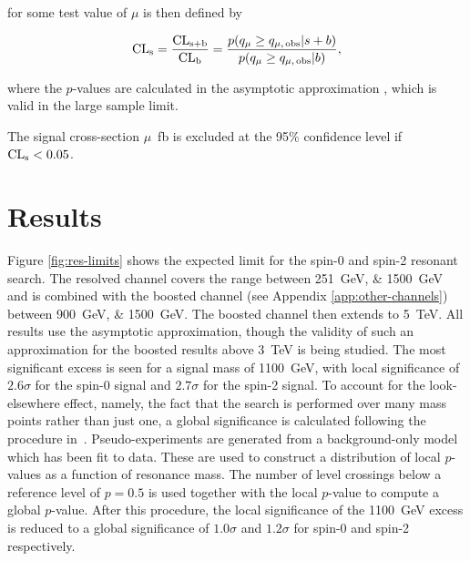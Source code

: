 \CLs for some test value of $\mu$ is then defined by

\begin{equation}
	\label{eqn:cls-def}
	\text{CL}\textsubscript{s} = \frac{\text{CL}\textsubscript{s+b}}{\text{CL}\textsubscript{b}} = \frac{p\qty({q}_{\mu} \ge {q}_{\mu,\,\text{obs}} | s + b)}{p\qty({q}_{\mu} \ge {q}_{\mu,\,\text{obs}} | b)},
\end{equation}

where the $p$-values are calculated in the asymptotic approximation
\cite{Cowan11}, which is valid in the large sample limit.

The signal cross-section {$\mu$}~\si{\femto\barn} is excluded at the 95\% confidence level if $\text{CL}\textsubscript{s} < 0.05$.

\FloatBarrier
\clearpage
\section{Results}
Figure \ref{fig:res-limits} shows the expected limit for the spin-0 and spin-2 resonant search. The 
resolved channel covers the range between \SIlist{251;1500}{\GeV} and is combined with the boosted channel (see Appendix \ref{app:other-channels}) between 
\SIlist{900;1500}{\GeV}. The boosted channel then extends to \SI{5}{\TeV}. All results use the asymptotic approximation, 
though the validity of such an approximation for the boosted results above \SI{3}{\TeV} is being studied. 
The most significant excess is seen for a signal mass of \SI{1100}{\GeV}, with local significance of 
$2.6\sigma$ for the spin-0 signal and 
$2.7\sigma$ for the spin-2 signal. To account for the look-elsewhere effect, namely, the fact that the search is 
performed over many mass points rather than just one, a global significance is calculated following the procedure 
in~\cite{LookElsewhereEffect}. Pseudo-experiments are generated from a background-only model which has been fit to 
data. These are used to construct a distribution of local $p$-values as a function of resonance mass. The number of 
level crossings below a reference level of $p=0.5$ is used together with the local $p$-value 
to compute a global $p$-value. After this procedure, the local significance of the \SI{1100}{\GeV} excess is reduced to a global significance of $1.0\sigma$ and $1.2\sigma$ for spin-0 and spin-2 respectively. 

